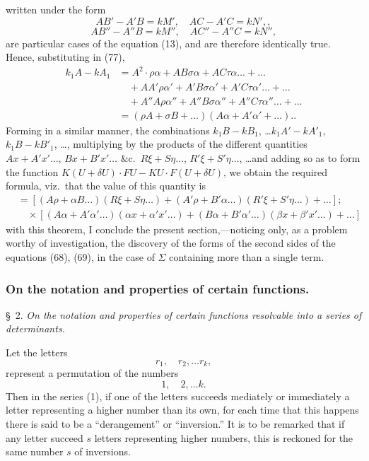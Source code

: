 \documentclass[11pt,a4paper]{article}
\theoremstyle{plain}
\theoremstyle{definition}
\theoremstyle{remark}
\begin{document}
written under the form
\[
AB' - A'B = kM', \quad AC - A'C = kN', \tag{79},
\]
\[
AB'' - A''B = kM'', \quad AC'' - A''C = kN'',
\]
are particular cases of the equation (13), and are therefore identically true. Hence,
substituting in (77),
\begin{align*}
k_1A - kA_1 &= A^2\cdot\rho\alpha + AB\sigma\alpha + AC\tau\alpha \ldots + \ldots \\
&\quad + AA'\rho\alpha' + A'B\sigma\alpha' + A'C\tau\alpha' \ldots + \ldots \\
&\quad + A''A\rho\alpha'' + A''B\sigma\alpha'' + A''C\tau\alpha'' \ldots + \ldots \\
&= (\rho A + \sigma B + \ldots)(A\alpha + A'\alpha' + \ldots).
\tag{80}.
\end{align*}
Forming in a similar manner, the combinations $k_1B - kB_1$, \ldots $k_1A' - kA'_1$, $k_1B - kB'_1$, \ldots,
multiplying by the products of the different quantities $Ax + A'x'\ldots$, $Bx + B'x' \ldots$
$\&$c.\ $R\xi + S\eta\ldots$, $R'\xi + S'\eta\ldots$, \ldots and adding so as to form the function $K(U+\delta U) \cdot FU
- KU \cdot F(U+\delta U)$, we obtain the required formula, viz.\ that the value of this quantity is
\begin{align*}
&= [(A\rho + \alpha B \ldots)(R\xi + S\eta \ldots) + (A'\rho + B'\alpha \ldots)(R'\xi + S'\eta \ldots) + \ldots] \tag{81};\\
&\quad \times [(A\alpha + A'\alpha' \ldots)(\alpha x + \alpha'x' \ldots) + (B\alpha + B'\alpha' \ldots)(\beta x + \beta'x' \ldots) + \ldots]
\end{align*}
with this theorem, I conclude the present section,---noticing only, as a problem worthy
of investigation, the discovery of the forms of the second sides of the equations
(68), (69), in the case of $\Sigma$ containing more than a single term.

\newpage
\subsubsection{On the notation and properties of certain functions.}

\textsc{\S\ 2.} \textit{On the notation and properties of certain functions resolvable into a series
of determinants.}

Let the letters
\[
r_1, \quad r_2, \ldots r_k
\tag{1},
\]
represent a permutation of the numbers
\[
1, \quad 2, \ldots k
\tag{2}.
\]
Then in the series (1), if one of the letters succeeds mediately or immediately
a letter representing a higher number than its own, for each time that this happens
there is said to be a ``derangement'' or ``inversion.'' It is to be remarked that if
any letter succeed $s$ letters representing higher numbers, this is reckoned for the
same number $s$ of inversions.
\end{document}
